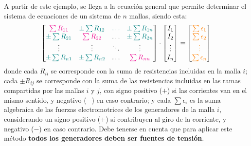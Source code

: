 \documentclass[11pt]{book} %
\numberwithin{dummy}{section}
\theoremstyle{ocrenumbox}
\theoremstyle{blacknumex}
\theoremstyle{blacknumbox}
\theoremstyle{ocrenum}
\newlength\esp
\begin{document}
	A partir de este ejemplo, se llega a la ecuación general que permite determinar el sistema de ecuaciones de un sistema de $n$ mallas, siendo esta: 
	\begin{equation*}
		\begin{bmatrix}
			{\color{magenta}\sum R_{11}} &  {\color{teal}\pm\sum R_{12}} & {\color{teal}{\dots}} & {\color{teal}\pm\sum R_{1n}} \\
			{\color{teal}\pm\sum R_{21}} & {\color{magenta}\sum R_{22}} & {{\dots}} & {\color{teal}\pm\sum R_{2n}} \\
			{\vdots} & {\vdots} &  {\ddots} & \vdots\\
			{\color{teal}\pm\sum R_{n1}} & {\color{teal}\pm\sum R_{n2}} & \dots & {\color{magenta}\sum R_{nn}}
		\end{bmatrix} \cdot 
		\begin{bmatrix}
			I_1\\
			I_2\\
			\vdots\\
			I_n
		\end{bmatrix} = %
		\begin{bmatrix}
			{\color{orange}\sum\epsilon_1}\\
			{\color{orange}\sum\epsilon_2}\\
			{\color{orange}\vdots}\\
			{\color{orange}\sum\epsilon_n}
		\end{bmatrix}
	\end{equation*}
	donde cada {\color{magenta}$R_{ii}$} se corresponde con la suma de resistencias incluidas en la malla $i$; cada {\color{teal}$\pm R_{ij}$} se corresponde con la suma de las resistencias incluidas en las ramas compartidas por las mallas $i$ y $j$, con signo positivo ($+$) si las corrientes van en el mismo sentido, y negativo ($-$) en caso contrario; y cada {\color{orange} $\sum \epsilon_i$} es la suma algebraica de las fuerzas electromotrices de los generadores de la malla $i$, considerando un signo positivo ($+$) si contribuyen al giro de la corriente, y negativo ($-$) en caso contrario. Debe tenerse en cuenta que para aplicar este método \textbf{todos los generadores deben ser fuentes de tensión}. 
	
\end{document}
